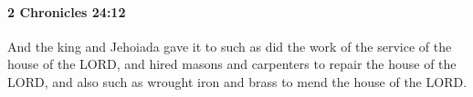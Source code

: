 
		\paragraph{2 Chronicles 24:12} %
			\label{2CHRONICLES-24-12}

			And the king and Jehoiada gave it to such as did the work of the service of the house of the LORD, and hired masons and carpenters to repair the house of the LORD, and also such as wrought iron and brass to mend the house of the LORD.


